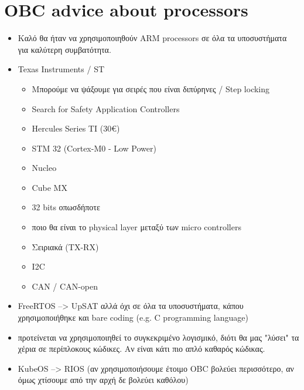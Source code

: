 \documentclass[a4paper,notitlepage]{article}
\begin{document}
	\section{OBC advice about processors}
	\begin{itemize}
		\item Καλό θα ήταν να χρησιμοποιηθούν ARM processors σε όλα τα υποσυστήματα για καλύτερη συμβατότητα.
		\item Texas Instruments / ST 
	\begin{itemize}
		\item Μπορούμε να ψάξουμε για σειρές που είναι διπύρηνες / Step locking
		\item Search for Safety Application Controllers
		\item Hercules Series TI (30€)
		\item STM 32 (Cortex-M0 - Low Power)
		\item Nucleo
		\item Cube MX
		\item 32 bits οπωσδήποτε
		\item ποιο θα είναι το physical layer μεταξύ των micro controllers
	\end{itemize}
	\begin{itemize}
		\item Σειριακά (TX-RX)
		\item I2C
		\item CAN / CAN-open
	
	\end{itemize}
		\item FreeRTOS --> UpSAT αλλά όχι σε όλα τα υποσυστήματα, κάπου χρησιμοποιήθηκε και bare coding (e.g. C programming language)
		\item προτείνεται να χρησιμοποιηθεί το συγκεκριμένο λογισμικό, διότι θα μας "λύσει" τα χέρια σε περίπλοκους κώδικες. Αν είναι κάτι πιο απλό καθαρός κώδικας.
		\item KubeOS --> RIOS (αν χρησιμοποιήσουμε έτοιμο OBC βολεύει περισσότερο, αν όμως χτίσουμε από την αρχή δε βολεύει καθόλου)
	\end{itemize}



		




	\glsaddall %
\printglossaries
\end{document}
